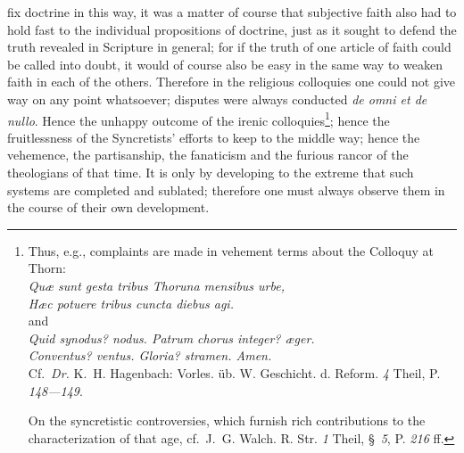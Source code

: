 \documentclass[12pt]{book}
\newcommand{\opage}[1]{\marginnote{\footnotesize\textit{[#1]}}}
\begin{document}
fix doctrine in this way, it was a matter of course that subjective faith also
had to hold fast to the individual propositions of doctrine, just as it sought
to defend the truth revealed in Scripture in general; for if the truth of one
article of faith could be called into doubt, it would of course also be easy
in the same way to weaken faith in each of the others. Therefore in the
religious colloquies one could not give way on any point whatsoever; disputes
were always conducted \textit{de omni et de nullo}. Hence the unhappy outcome
of the irenic colloquies\footnote{Thus, e.g., complaints are made in vehement
terms about the Colloquy at Thorn:\\
\textit{Quæ sunt gesta tribus Thoruna mensibus urbe,}\\
\textit{Hæc potuere tribus cuncta diebus agi.}\\
and\\
\textit{Quid synodus? nodus. Patrum chorus integer? æger.}\\
\textit{Conventus? ventus. Gloria? stramen. Amen.}\\
Cf.\ \textit{Dr.} K.~H. Hagenbach: Vorles. üb. W. Geschicht. d. Reform.
\textit{4} Theil, P. \textit{148---149}.

On the syncretistic controversies, which furnish rich contributions to the
characterization of that age, cf.\ J.~G. Walch. R. Str. \textit{1} Theil,
§~\textit{5}, P. \textit{216} ff.}; hence the fruitlessness of the
Syncretists' efforts to keep to the middle way; hence the vehemence, the
partisanship, the fanaticism
\opage{85} and the furious rancor of the theologians of that time. It is only
by developing to the extreme that such systems are completed and sublated;
therefore one must always observe them in the course of their own
development.
\end{document}
